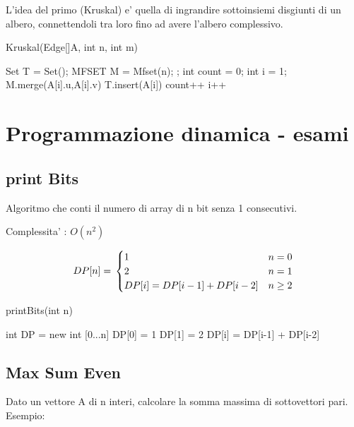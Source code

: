 \documentclass[oneside]{book}
\begin{document}
L'idea del primo (Kruskal) e' quella di ingrandire sottoinsiemi disgiunti di un albero, connettendoli tra loro fino ad avere l'albero complessivo.

\begin{algorithm}
\caption{Kruskal(Edge[]A, int n, int m)\label{alg:cap}}

\begin{algorithmic}
\State Set T = Set();
\State MFSET M = Mfset(n);
;
\State int count = 0;
\State int i = 1;
	\State M.merge(A[i].u,A[i].v)
	\State T.insert(A[i])
	\State count++
	\EndIf
	\State i++
\EndWhile

\end{algorithmic}
\end{algorithm}



\chapter{Programmazione dinamica - esami}

\section{print Bits}
Algoritmo che conti il numero di array di n bit senza 1 consecutivi.

Complessita' : $O(n^2)$

\begin{equation}
	DP[n] = \\
	\begin{cases}
	1 & n=0 \\
	2 & n=1 \\
	DP[i] = DP[i-1] + DP[i-2] & n \geq 2
	\end{cases}
\end{equation}

\begin{algorithm}
\caption{printBits(int n)\label{alg:cap}}
\begin{algorithmic}
	\State int DP = new int [0...n]
	\State DP[0] = 1
	\State DP[1] = 2
		\State DP[i] = DP[i-1] + DP[i-2]
	\EndFor
\end{algorithmic}
\end{algorithm}
\section{Max Sum Even}
Dato un vettore A di n interi, calcolare la somma massima di sottovettori pari. Esempio:
\end{document}
